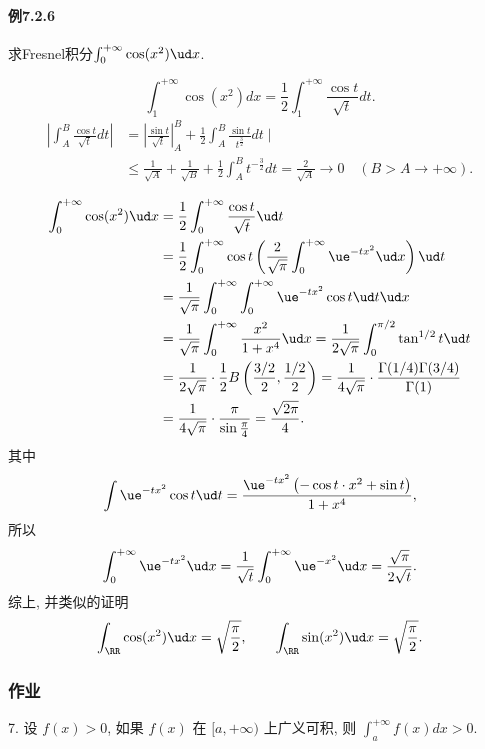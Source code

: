\paragraph{例7.2.6}

求Fresnel积分$\int_{0}^{+\infty}\cos(x^{2})\ud x$.

\[
\int_{1}^{+\infty}\cos\left(x^{2}\right)dx=\frac{1}{2}\int_{1}^{+\infty}\frac{\cos t}{\sqrt{t}}dt.
\]
\[
\begin{aligned}\left|\int_{A}^{B}\frac{\cos t}{\sqrt{t}}dt\right| & =\left|\frac{\sin t}{\sqrt{t}}\right|_{A}^{B}+\frac{1}{2}\int_{A}^{B}\frac{\sin t}{t^{\frac{3}{2}}}dt\mid\\
	& \leqslant\frac{1}{\sqrt{A}}+\frac{1}{\sqrt{B}}+\frac{1}{2}\int_{A}^{B}t^{-\frac{3}{2}}dt=\frac{2}{\sqrt{A}}\rightarrow0\quad(B>A\rightarrow+\infty).
\end{aligned}
\]

\begin{align*}
	\int_{0}^{+\infty}\cos(x^{2})\ud x & =\frac{1}{2}\int_{0}^{+\infty}\frac{\cos t}{\sqrt{t}}\ud t\\
	& =\frac{1}{2}\int_{0}^{+\infty}\cos t\left(\frac{2}{\sqrt{\pi}}\int_{0}^{+\infty}\ue^{-tx^{2}}\ud x\right)\ud t\\
	& =\frac{1}{\sqrt{\pi}}\int_{0}^{+\infty}\int_{0}^{+\infty}\ue^{-tx^{2}}\cos t\ud t\ud x\\
	& =\frac{1}{\sqrt{\pi}}\int_{0}^{+\infty}\frac{x^{2}}{1+x^{4}}\ud x=\frac{1}{2\sqrt{\pi}}\int_{0}^{\pi/2}\tan^{1/2}t\ud t\\
	& =\frac{1}{2\sqrt{\pi}}\cdot\frac{1}{2}B\left(\frac{3/2}{2},\frac{1/2}{2}\right)=\frac{1}{4\sqrt{\pi}}\cdot\frac{\Gamma(1/4)\Gamma(3/4)}{\Gamma(1)}\\
	& =\frac{1}{4\sqrt{\pi}}\cdot\frac{\pi}{\sin\frac{\pi}{4}}=\frac{\sqrt{2\pi}}{4}.
\end{align*}
其中
\[
\int\ue^{-tx^{2}}\cos t\ud t=\frac{\ue^{-tx^{2}}\left(-\cos t\cdot x^{2}+\sin t\right)}{1+x^{4}},
\]
所以
\[
\int_{0}^{+\infty}\ue^{-tx^{2}}\ud x=\frac{1}{\sqrt{t}}\int_{0}^{+\infty}\ue^{-x^{2}}\ud x=\frac{\sqrt{\pi}}{2\sqrt{t}}.
\]
综上, 并类似的证明
\[
\int_{\RR}\cos(x^{2})\ud x=\sqrt{\frac{\pi}{2}},\qquad\int_{\RR}\sin(x^{2})\ud x=\sqrt{\frac{\pi}{2}}.
\]


\subsubsection{作业}

7. 设 $f(x)>0$, 如果 $f(x)$ 在 $[a,+\infty)$ 上广义可积, 则 $\int_{a}^{+\infty}f(x)dx>0$. 

